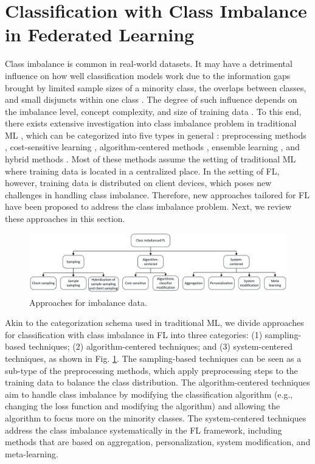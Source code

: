 \documentclass[10pt,journal,compsoc]{IEEEtran}
\begin{document}
\section{Classification with Class Imbalance in Federated Learning}
\label{sec:classification}
Class imbalance is common in real-world datasets. It may have a detrimental influence on how well classification models work due to the information gaps brought by limited sample sizes of a minority class, the overlaps between classes, and small disjuncts within one class \cite{ali2013classification}. The degree of such influence depends on the imbalance level, concept complexity, and size of training data \cite{japkowicz2002class}. To this end, there exists extensive investigation into class imbalance problem in traditional ML \cite{guo2008class} \cite{ali2013classification}, which can be categorized into five types in general \cite{xiao2021experimental}: preprocessing methods \cite{lopez2013insight}, cost-sensitive learning \cite{krawczyk2014cost}, algorithm-centered methods \cite{singh2015survey}, ensemble learning \cite{galar2011review}, and hybrid methods \cite{liu2008exploratory}. Most of these methods assume the setting of traditional ML where training data is located in a centralized place. In the setting of FL, however, training data is distributed on client devices, which poses new challenges in handling class imbalance. Therefore, new approaches tailored for FL have been proposed to address the class imbalance problem. Next, we review these approaches in this section.

\begin{figure}[!t]
\centering
\setlength{\abovecaptionskip}{-0.2cm}
\includegraphics[scale=0.6]{methods.jpg}
\caption{Approaches for imbalance data.}
\label{Approaches for imbalance data}
\end{figure}

Akin to the categorization schema used in traditional ML, we divide approaches for classification with class imbalance in FL into three categories: (1) sampling-based techniques; (2) algorithm-centered techniques; and (3) system-centered techniques, as shown in Fig. \ref{Approaches for imbalance data}. The sampling-based techniques can be seen as a sub-type of the preprocessing methods, which apply preprocessing steps to the training data to balance the class distribution. The algorithm-centered techniques aim to handle class imbalance by modifying the classification algorithm (e.g., changing the loss function and modifying the algorithm) and allowing the algorithm to focus more on the minority classes. The system-centered techniques address the class imbalance systematically in the FL framework, including methods that are based on aggregation, personalization, system modification, and meta-learning. 
\vspace{-0.2cm}
\end{document}
